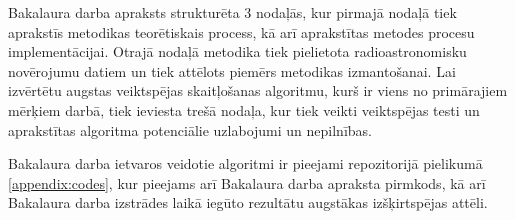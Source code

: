 Bakalaura darba apraksts strukturēta 3 nodaļās, kur pirmajā nodaļā tiek aprakstīs metodikas teorētiskais process, kā arī aprakstītas metodes procesu implementācijai. Otrajā nodaļā metodika tiek pielietota radioastronomisku novērojumu datiem un tiek attēlots piemērs metodikas izmantošanai. Lai izvērtētu augstas veiktspējas skaitļošanas algoritmu, kurš ir viens no primārajiem mērķiem darbā, tiek ieviesta trešā nodaļa, kur tiek veikti veiktspējas testi un aprakstītas algoritma potenciālie uzlabojumi un nepilnības.

Bakalaura darba ietvaros veidotie algoritmi ir pieejami repozitorijā pielikumā \ref{appendix:codes}, kur pieejams arī Bakalaura darba apraksta pirmkods, kā arī Bakalaura darba izstrādes laikā iegūto rezultātu augstākas izšķirtspējas attēli.











